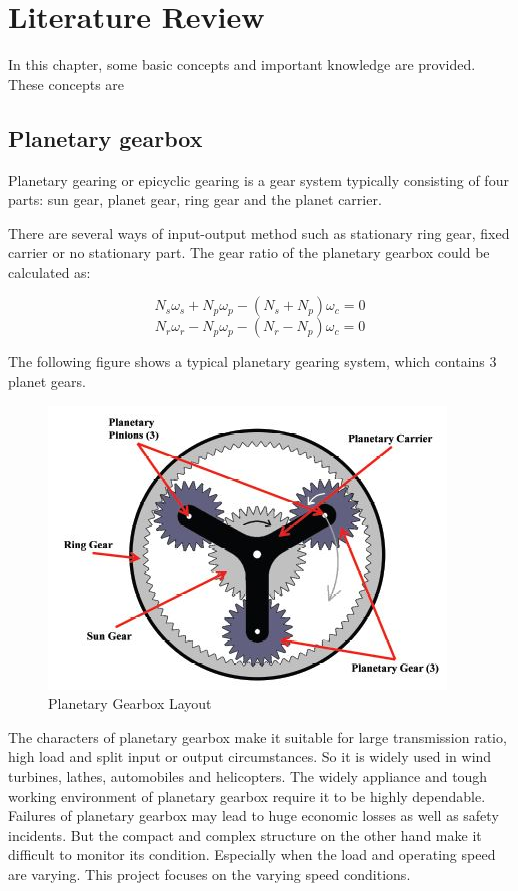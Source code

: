 \chapter{Literature Review}\label{ch:literature}

In this chapter, some basic concepts and important knowledge are provided. These concepts are 

\section{Planetary gearbox}

Planetary gearing or epicyclic gearing is a gear system typically consisting of four parts: sun gear, planet gear, ring gear and the planet carrier.

There are several ways of input-output method such as stationary ring gear, fixed carrier or no stationary part. The gear ratio of the planetary gearbox could be calculated as:

\begin{equation}
	N_s\omega_s + N_p\omega_p - (N_s + N_p)\omega_c = 0
\end{equation}
\begin{equation}
	N_r\omega_r - N_p\omega_p - (N_r - N_p)\omega_c = 0
\end{equation}

The following figure shows a typical planetary gearing system, which contains 3 planet gears.

\begin{figure}
	\centering
	\includegraphics{PGB}
	\caption{Planetary Gearbox Layout\cite{gearbox}}
	\label{simulationfigure}
\end{figure}

The characters of planetary gearbox make it suitable for large transmission ratio, high load and split input or output circumstances. So it is widely used in wind turbines, lathes, automobiles and helicopters. The widely appliance and tough working environment of planetary gearbox require it to be highly dependable. Failures of planetary gearbox may lead to huge economic losses as well as safety incidents. But the compact and complex structure on the other hand make it difficult to monitor its condition. Especially when the load and operating speed are varying. This project focuses on the varying speed conditions.


